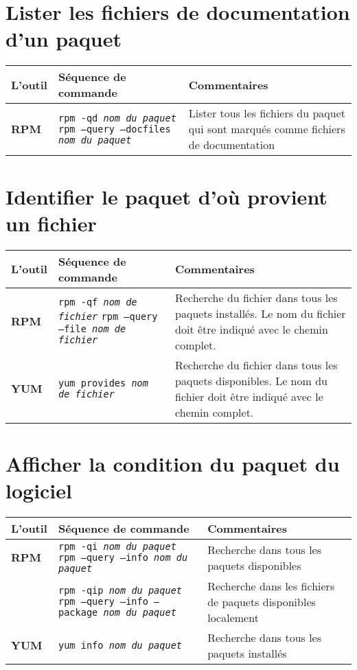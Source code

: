 \documentclass[10pt,a4paper]{article}
\newcommand{\tabellenkopf}{
  \textbf{L'outil} & \textbf{Séquence de commande} & \textbf{Commentaires} \\
}
\begin{document}
\section{Lister les fichiers de documentation d'un paquet}
\begin{tabular}{ p{3.5cm} p{9cm} p{11cm}}
  \hline
  \rowcolor{Gray}
  \tabellenkopf
  \hline 
  \textbf{RPM} & \texttt{rpm -qd \textit{nom du paquet}} \newline \texttt{rpm --query --docfiles \textit{nom du paquet}} & Lister tous les fichiers du paquet qui sont marqués comme fichiers de documentation\\
  \hline
\end{tabular}
\newpage

\cheatsheet

\section{Identifier le paquet d'où provient un fichier}
\begin{tabular}{ p{3.5cm} p{9cm} p{11cm}}
  \hline
  \rowcolor{Gray}
  \tabellenkopf
  \hline 
  \textbf{RPM} & \texttt{rpm -qf \textit{nom de fichier}} \newline \texttt{rpm --query --file \textit{nom de fichier}} & Recherche du fichier dans tous les paquets installés. Le nom du fichier doit être indiqué avec le chemin complet.\\
  \rowcolor{Gray}
  \textbf{YUM} & \texttt{yum provides \textit{nom de fichier}} & Recherche du fichier dans tous les paquets disponibles. Le nom du fichier doit être indiqué avec le chemin complet. \\
  \hline
\end{tabular}

\section{Afficher la condition du paquet du logiciel}
\begin{tabular}{ p{3.5cm} p{9cm} p{11cm}}
  \hline
  \rowcolor{Gray}
  \tabellenkopf
  \hline 
  \textbf{RPM} & \texttt{rpm -qi \textit{nom du paquet}} \newline \texttt{rpm --query --info \textit{nom du paquet}} & Recherche dans tous les paquets disponibles\\
  \rowcolor{Gray}
  & \texttt{rpm -qip \textit{nom du paquet}} \newline \texttt{rpm --query --info --package \textit{nom du paquet}} & Recherche dans les fichiers de paquets disponibles localement\\
  \textbf{YUM} & \texttt{yum info \textit{nom du paquet}} & Recherche dans tous les paquets installés\\
  \hline
\end{tabular}
\end{document}
